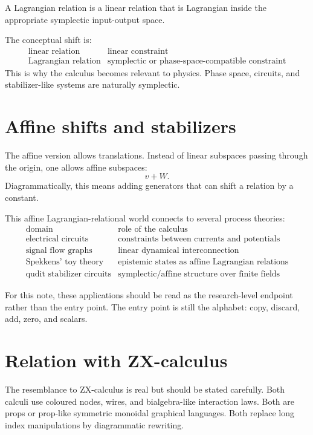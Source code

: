 \begin{definition}
A Lagrangian relation is a linear relation that is Lagrangian inside the appropriate symplectic input-output space.
\end{definition}

The conceptual shift is:
\[
\begin{array}{c|c}
\text{linear relation} & \text{linear constraint}\\
\text{Lagrangian relation} & \text{symplectic or phase-space-compatible constraint}
\end{array}
\]
This is why the calculus becomes relevant to physics.  Phase space, circuits, and stabilizer-like systems are naturally symplectic.

\section{Affine shifts and stabilizers}

The affine version allows translations.  Instead of linear subspaces passing through the origin, one allows affine subspaces:
\[
  v+W.
\]
Diagrammatically, this means adding generators that can shift a relation by a constant.

This affine Lagrangian-relational world connects to several process theories:
\[
\begin{array}{c|c}
\text{domain} & \text{role of the calculus}\\
\hline
\text{electrical circuits} & \text{constraints between currents and potentials}\\
\text{signal flow graphs} & \text{linear dynamical interconnection}\\
\text{Spekkens' toy theory} & \text{epistemic states as affine Lagrangian relations}\\
\text{qudit stabilizer circuits} & \text{symplectic/affine structure over finite fields}
\end{array}
\]

For this note, these applications should be read as the research-level endpoint rather than the entry point.  The entry point is still the alphabet: copy, discard, add, zero, and scalars.

\section{Relation with ZX-calculus}

The resemblance to ZX-calculus is real but should be stated carefully.  Both calculi use coloured nodes, wires, and bialgebra-like interaction laws.  Both are props or prop-like symmetric monoidal graphical languages.  Both replace long index manipulations by diagrammatic rewriting.

